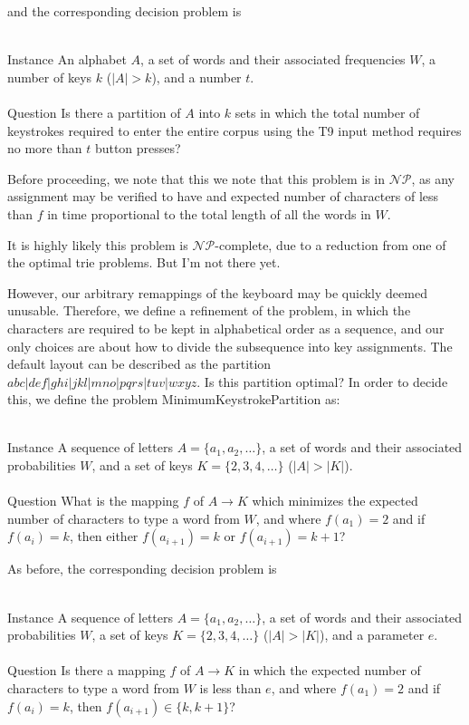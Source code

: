 \documentclass[runningheads]{llncs}
\newcommand{\NP}{\ensuremath{\mathcal{NP}}}
\begin{document}
and the corresponding decision problem is

\begin{prob}~\\
{\sc Instance} An alphabet $A$, a set of words and their associated frequencies $W$, a number of keys $k$ ($|A| > k$), and a number $t$.\\
~\\
{\sc Question} Is there a partition of $A$ into $k$ sets in which the total number of keystrokes required to enter the entire corpus using the T9 input method requires no more than $t$ button presses?
\end{prob}

Before proceeding, we note that this we note that this problem is in \NP, as
any assignment may be verified to have and expected number of characters of
less than $f$ in time proportional to the total length of all the words in $W$.

It is highly likely this problem is \NP-complete, due to a reduction from one of the optimal trie problems.  But I'm not there yet.

However, our arbitrary remappings of the keyboard may be quickly deemed unusable.  Therefore, we define a refinement of the problem, in which the characters are required to be kept in alphabetical order as a sequence, and our only choices are about how to divide the subsequence into key assignments.  The default layout can be described as the partition $abc|def|ghi|jkl|mno|pqrs|tuv|wxyz$.  Is this partition optimal?  In order to decide this, we define the problem {\sc MinimumKeystrokePartition} as:
\begin{prob}[{\sc MinimumKeystrokePartition}]~\\
\label{thm:minpartition}
{\sc Instance} A sequence of letters $A = \{a_1, a_2, \ldots \}$, a set of words and their associated probabilities $W$, and a set of keys $K = \{2, 3, 4, \ldots \}$ ($|A| > |K|$).\\
~\\
{\sc Question} What is the mapping $f$ of $A \to K$ which minimizes the expected number of characters to type a word from $W$, and where $f(a_1) = 2$ and if $f(a_i) = k$, then either $f(a_{i+1}) = k$ or $f(a_{i+1}) = k+1$?
\end{prob}

As before, the corresponding decision problem is
\begin{prob}~\\
{\sc Instance} A sequence of letters $A = \{a_1, a_2, \ldots \}$, a set of words and their associated probabilities $W$, a set of keys $K = \{2, 3, 4, \ldots \}$ ($|A| > |K|$), and a parameter $e$.\\
~\\
{\sc Question} Is there a mapping $f$ of $A \to K$ in which the expected number of characters to type a word from $W$ is less than $e$, and where $f(a_1) = 2$ and if $f(a_i) = k$, then $f(a_{i+1}) \in \{k, k+1\}$?
\end{prob}
\end{document}
